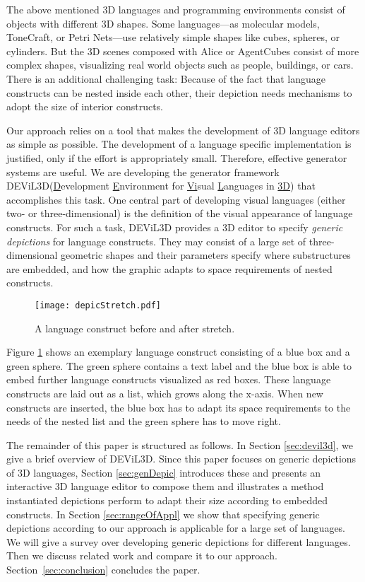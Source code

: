 \documentclass[a4paper]{article}
\newcommand{\dev}{DEViL3D\xspace}
\begin{document}
The above mentioned 3D languages and programming environments consist of objects with different 3D shapes. Some languages---as molecular models, ToneCraft, or Petri Nets---use relatively simple shapes like cubes, spheres, or cylinders. But the 3D scenes composed with Alice or AgentCubes consist of more complex shapes, visualizing real world objects such as people, buildings, or cars. There is an additional challenging task: Because of the fact that language constructs can be nested inside each other, their depiction needs mechanisms to adopt the size of interior constructs.

Our approach relies on a tool that makes the development of 3D language editors as simple as possible. The development of a language specific implementation is justified, only if the effort is appropriately small. Therefore, effective generator systems are useful. We are developing the generator framework \dev (\underline{D}evelopment \underline{E}nvironment for \underline{Vi}sual \underline{L}anguages in \underline{3D}) that accomplishes this task. One central part of developing visual languages (either two- or three-dimensional) is the definition of the visual appearance of language constructs. For such a task, \dev provides a 3D editor to specify \emph{generic depictions} for language constructs. They may consist of a large set of three-dimensional geometric shapes and their parameters specify where substructures are embedded, and how the graphic adapts to space requirements of nested constructs.

\begin{figure}[!ht]
  \centering
  \texttt{[image: depicStretch.pdf]}
  \caption{A language construct before and after stretch.}
  \label{fig:depicStretch}
\end{figure}

Figure \ref{fig:depicStretch} shows an exemplary language construct consisting of a blue box and a green sphere. The green sphere contains a text label and the blue box is able to embed further language constructs visualized as red boxes. These language constructs are laid out as a list, which grows along the $\mathrm{x}$-axis. When new constructs are inserted, the blue box has to adapt its space requirements to the needs of the nested list and the green sphere has to move right.


The remainder of this paper is structured as follows. In Section \ref{sec:devil3d}, we give a brief overview of \dev. Since this paper focuses on generic depictions of 3D languages, Section \ref{sec:genDepic} introduces these and presents an interactive 3D language editor to compose them and illustrates a method instantiated depictions perform to adapt their size according to embedded constructs. In Section \ref{sec:rangeOfAppl} we show that specifying generic depictions according to our approach is applicable for a large set of languages. We will give a survey over developing generic depictions for different languages. Then we discuss related work and compare it to our approach. Section~\ref{sec:conclusion} concludes the paper.
\end{document}
